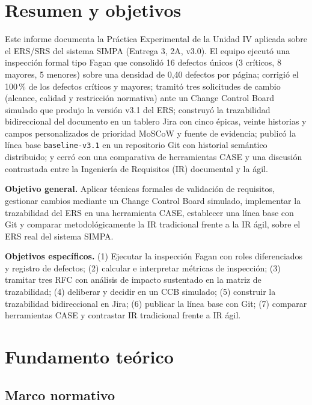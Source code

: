 \documentclass[11pt,a4paper]{article}
\begin{document}
\section{Resumen y objetivos}

Este informe documenta la Práctica Experimental de la Unidad IV aplicada sobre el ERS/SRS del
sistema SIMPA (Entrega 3, 2A, v3.0). El equipo ejecutó una inspección formal tipo Fagan que
consolidó 16 defectos únicos (3 críticos, 8 mayores, 5 menores) sobre una densidad de 0,40
defectos por página; corrigió el 100\,\% de los defectos críticos y mayores; tramitó tres
solicitudes de cambio (alcance, calidad y restricción normativa) ante un Change Control Board
simulado que produjo la versión v3.1 del ERS; construyó la trazabilidad bidireccional del
documento en un tablero Jira con cinco épicas, veinte historias y campos personalizados de
prioridad MoSCoW y fuente de evidencia; publicó la línea base \texttt{baseline-v3.1} en un
repositorio Git con historial semántico distribuido; y cerró con una comparativa de herramientas
CASE y una discusión contrastada entre la Ingeniería de Requisitos (IR) documental y la ágil.

\textbf{Objetivo general.} Aplicar técnicas formales de validación de requisitos, gestionar
cambios mediante un Change Control Board simulado, implementar la trazabilidad del ERS en una
herramienta CASE, establecer una línea base con Git y comparar metodológicamente la IR
tradicional frente a la IR ágil, sobre el ERS real del sistema SIMPA.

\textbf{Objetivos específicos.} (1) Ejecutar la inspección Fagan con roles diferenciados y
registro de defectos; (2) calcular e interpretar métricas de inspección; (3) tramitar tres RFC
con análisis de impacto sustentado en la matriz de trazabilidad; (4) deliberar y decidir en un
CCB simulado; (5) construir la trazabilidad bidireccional en Jira; (6) publicar la línea base con
Git; (7) comparar herramientas CASE y contrastar IR tradicional frente a IR ágil.

\section{Fundamento teórico}

\subsection{Marco normativo}
\end{document}
